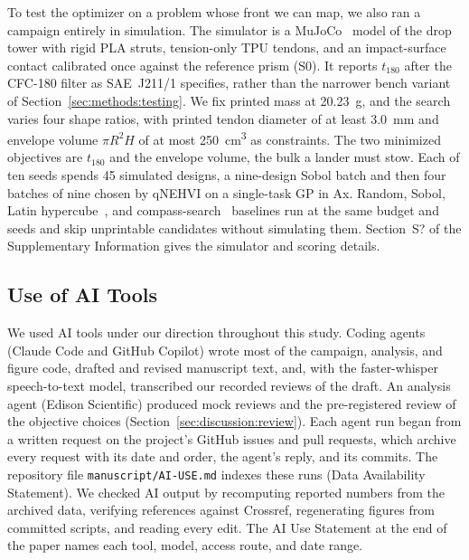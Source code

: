 \documentclass[11pt]{article}
\providecommand{\siref}[1]{S?}
\begin{document}
To test the optimizer on a problem whose front we can map, we
also ran a campaign entirely in simulation. The simulator is a
MuJoCo~\citep{todorov2012mujoco} model of the drop tower with rigid
PLA struts, tension-only TPU tendons, and an impact-surface contact
calibrated once against the reference prism (S0). It reports $t_{180}$
after the CFC-180 filter as SAE~J211/1 specifies, rather than the
narrower bench variant of Section~\ref{sec:methods:testing}. We fix
printed mass at \SI{20.23}{g},
and the search varies four shape ratios, with printed tendon diameter
of at least \SI{3.0}{mm} and envelope volume $\pi R^2 H$ of at most
\SI{250}{cm^3} as constraints. The two minimized objectives are
$t_{180}$ and the envelope volume, the bulk a lander must stow. Each of
ten seeds spends 45 simulated designs, a nine-design Sobol batch and
then four batches of nine chosen by qNEHVI on a single-task GP in Ax.
Random, Sobol, Latin hypercube~\citep{mckay1979lhs}, and
compass-search~\citep{kolda2003directsearch} baselines run at the same
budget and seeds and skip unprintable candidates without simulating
them. Section~\siref{si:sim-campaign} of the Supplementary
Information gives the simulator and scoring details.

\subsection{Use of AI Tools}
\label{sec:methods:ai}

We used AI tools under our direction throughout this study. Coding
agents (Claude Code and GitHub Copilot) wrote most of the campaign,
analysis, and figure code, drafted and revised manuscript text, and,
with the faster-whisper speech-to-text model, transcribed our recorded
reviews of the draft. An analysis agent (Edison Scientific) produced
mock reviews and the pre-registered review of the objective choices
(Section~\ref{sec:discussion:review}). Each agent run began from a
written request on the project's GitHub issues and pull requests, which
archive every request with its date and order, the agent's reply, and
its commits. The repository file \texttt{manuscript/AI-USE.md} indexes
these runs (Data Availability Statement). We checked AI output by recomputing reported numbers from
the archived data, verifying references against Crossref, regenerating
figures from committed scripts, and reading every edit. The
AI Use Statement at the end of the paper names each tool, model, access route, and date range.

\end{document}
